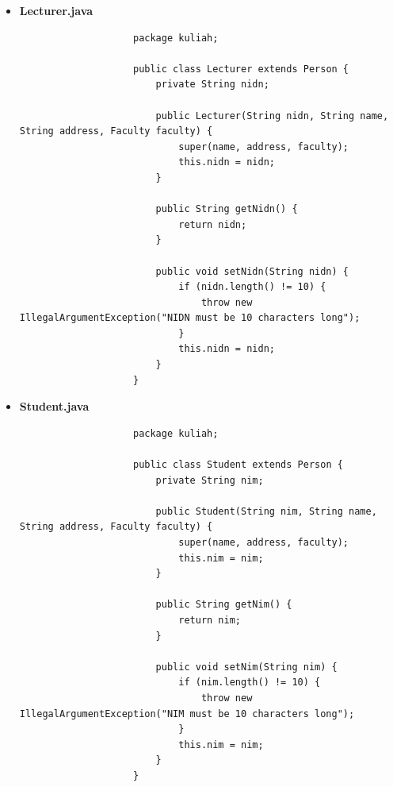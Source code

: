 \documentclass[12pt,titlepage]{article}
\begin{document}
\begin{itemize}
{\begin{itemize}
{\begin{verbatim}
                        public Faculty getFaculty() {
                            return faculty;
                        }

                        public void setFaculty(Faculty faculty) {
                            this.faculty = faculty;
                        }
                    }
                \end{verbatim}
            }
            \item {
                \textbf{Lecturer.java}
                \begin{verbatim}
                    package kuliah;

                    public class Lecturer extends Person {
                        private String nidn;

                        public Lecturer(String nidn, String name, String address, Faculty faculty) {
                            super(name, address, faculty);
                            this.nidn = nidn;
                        }

                        public String getNidn() {
                            return nidn;
                        }

                        public void setNidn(String nidn) {
                            if (nidn.length() != 10) {
                                throw new IllegalArgumentException("NIDN must be 10 characters long");
                            }
                            this.nidn = nidn;
                        }
                    }
                \end{verbatim}
            }
            \item {
                \textbf{Student.java}
                \begin{verbatim}
                    package kuliah;

                    public class Student extends Person {
                        private String nim;

                        public Student(String nim, String name, String address, Faculty faculty) {
                            super(name, address, faculty);
                            this.nim = nim;
                        }

                        public String getNim() {
                            return nim;
                        }

                        public void setNim(String nim) {
                            if (nim.length() != 10) {
                                throw new IllegalArgumentException("NIM must be 10 characters long");
                            }
                            this.nim = nim;
                        }
                    }
                \end{verbatim}
            }
        \end{itemize}
    }
\end{itemize}
\end{document}
